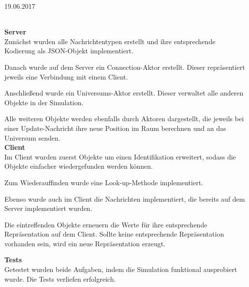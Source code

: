 \documentclass{rp}
\begin{document}


{19.06.2017} %

%
\\
\textbf{Server}\\
Zunächst wurden alle Nachrichtentypen erstellt und ihre entsprechende Kodierung als JSON-Objekt implementiert.

Danach wurde auf dem Server ein Connection-Aktor erstellt. Dieser repräsentiert jeweils eine Verbindung mit einem Client. 

Anschließend wurde ein Universums-Aktor erstellt. Dieser verwaltet alle anderen Objekte in der Simulation. 

Alle weiteren Objekte werden ebenfalls durch Aktoren dargestellt, die jeweils bei einer Update-Nachricht ihre neue Position im Raum berechnen und an das Universum senden. 
\\
\textbf{Client}\\
Im Client wurden zuerst Objekte um einen Identifikation erweitert, sodass die Objekte einfacher wiedergefunden werden können. 

Zum Wiederauffinden wurde eine Look-up-Methode implementiert.

Ebenso wurde auch im Client die Nachrichten implementiert, die bereits auf dem Server implementiert wurden. 

Die eintreffenden Objekte erneuern die Werte für ihre entsprechende Repräsentation auf dem Client. Sollte keine entsprechende Repräsentation vorhanden sein, wird ein neue Repräsentation erzeugt. 


\textbf{Tests}\\
Getestet wurden beide Aufgaben, indem die Simulation funktional ausprobiert wurde. Die Tests verliefen erfolgreich.
\end{document}
